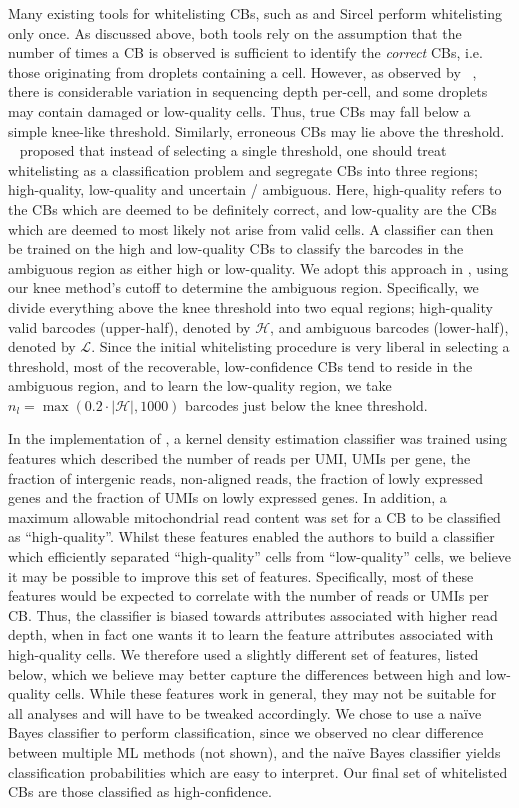 Many existing tools for whitelisting CBs, such as \cellr \citep{tenx} and Sircel\citep{sircel} perform whitelisting only once. As discussed above, both tools rely on the assumption that the number of times a CB is observed is sufficient to identify the \emph{correct} CBs, i.e. those originating from droplets containing a cell. However, as observed by ~\citet{dropest}, there is considerable variation in sequencing depth per-cell, and some droplets may contain damaged or low-quality cells. Thus, true CBs may fall below a simple knee-like threshold. Similarly, erroneous CBs may lie above the threshold. ~\citet{dropest} proposed that instead of selecting a single threshold, one should treat whitelisting as a classification problem and segregate CBs into three regions; high-quality, low-quality and uncertain / ambiguous. Here, high-quality refers to the CBs which are deemed to be definitely correct, and low-quality are the CBs which are deemed to most likely not arise from valid cells. A classifier can then be trained on the high and low-quality CBs to classify the barcodes in the ambiguous region as either high or low-quality. We adopt this approach in \alevin, using our knee method's cutoff to determine the ambiguous region. Specifically, we divide everything above the knee threshold into two equal regions; high-quality valid barcodes (upper-half), denoted by $\mathcal{H}$, and ambiguous barcodes (lower-half), denoted by $\mathcal{L}$. Since the initial whitelisting procedure is very liberal in selecting a threshold, most of the recoverable, low-confidence CBs tend to reside in the ambiguous region, and to learn the low-quality region, we take $n_l = \max( 0.2 \cdot \left|\mathcal{H}\right|, 1000)$ barcodes just below the knee threshold.

In the implementation of \citet{dropest}, a kernel density estimation classifier was trained using features which described the number of reads per UMI, UMIs per gene, the fraction of intergenic reads, non-aligned reads, the fraction of lowly expressed genes and the fraction of UMIs on lowly expressed genes. In addition, a maximum allowable mitochondrial read content was set for a CB to be classified as ``high-quality''. Whilst these features enabled the authors to build a classifier which efficiently separated ``high-quality'' cells from ``low-quality'' cells, we believe it may be possible to improve this set of features. Specifically, most of these features would be expected to correlate with the number of reads or UMIs per CB. Thus, the classifier is biased towards attributes  associated with higher read depth, when in fact one wants it to learn the feature attributes associated with high-quality cells. We therefore used a slightly different set of features, listed below, which we believe may better capture the differences between high and low-quality cells. While these features work in general, they may not be suitable for all analyses and will have to be tweaked accordingly. We chose to use a na\"ive Bayes classifier to perform classification, since we observed no clear difference between multiple ML methods (not shown), and the na\"ive Bayes classifier yields classification probabilities which are easy to interpret. Our final set of whitelisted CBs are those classified as high-confidence.


